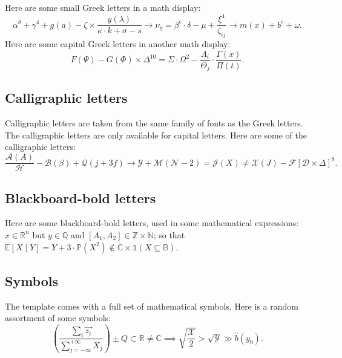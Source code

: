 \documentclass[letterpaper,11pt,leqno]{article}
\begin{document}
Here are some small Greek letters in a math display: 
\begin{equation*}
\alpha^{\theta} + \gamma^4 + g(a) - \zeta \times \frac{y(\lambda)}{\kappa \cdot k+ \sigma - s} \to \nu_{\eta} = \beta^\epsilon \cdot \delta - \mu + \frac{\xi^4}{\zeta_{ij}} \to m(x) + b^e + \omega .
\end{equation*}
Here are some capital Greek letters in another math display: 
\begin{equation}
F(\Psi) - G(\Phi) \times \Delta^{10} = \Sigma \cdot \Omega^2 - \frac{\Lambda_i}{\Theta_j} \cdot \frac{\Gamma(x)}{\Pi(t)}.
\label{e:capitalgreek}\end{equation}

\subsection{Calligraphic letters} 

Calligraphic letters are taken from the same family of fonts as the Greek letters. The calligraphic letters are only available for capital letters. Here are some of the calligraphic letters: 
\begin{equation*}
\frac{\mathcal{A}(A)}{\mathcal{H}} - \mathcal{B}(\beta) + \mathcal{Q}(j+3f) \to \mathcal{Y} + \mathcal{M}(\mathcal{N} - 2) = \mathcal{J}(X) \neq \mathcal{X}(J) - \mathcal{F}[\mathcal{D} \times \Delta]^8. 
\end{equation*}

\subsection{Blackboard-bold letters} 

Here are some blackboard-bold letters, used in some mathematical expressions: $x \in\mathbb{R}^n$ but $y\in \mathbb{Q}$ and $[A_1,A_2] \in \mathbb{Z} \times \mathbb{N}$; so that $\mathbb{E}[X\mid Y] = Y + 3 \cdot \mathbb{P}(X^2) \notin \mathbb{C} \times \mathbb{1}(X \subseteq \mathbb{B})$.

\subsection{Symbols} 

The template comes with a full set of mathematical symbols. Here is a random assortment of some symbols: 
\begin{equation*}
\left(\frac{\sum_i \vec{z_i}}{\sum_{j=-\infty}^{+\infty} X_j}\right) \pm Q \subset \mathbb{R} \neq \mathbb{C} \implies \sqrt{\frac{\mathcal{X}}{2}} > \sqrt{\mathcal{Y}} \gg \hat{b}(y_0).
\end{equation*}
\end{document}
